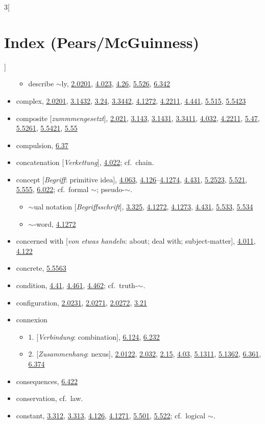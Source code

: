 \documentclass[oneside,openany,12pt]{book}
\newcommand{\indexentry}[1]{\item #1}
\newcommand{\indexsubentry}[1]{\begin{itemize} \item #1 \end{itemize}}
\newcommand{\indexref}[1]{\hyperlink{prop#1}{#1}}
\begin{document}
\begin{multicols}{3}[\section*{Index (Pears/McGuinness)}]
\begin{itemize}
   \indexsubentry{describe $\sim$ly, \indexref{2.0201}, \indexref{4.023}, \indexref{4.26}, \indexref{5.526}, \indexref{6.342}}

\indexentry{complex, \indexref{2.0201}, \indexref{3.1432}, \indexref{3.24}, \indexref{3.3442}, \indexref{4.1272}, \indexref{4.2211}, \indexref{4.441}, \indexref{5.515}, \indexref{5.5423}}

\indexentry{composite [\textit{zummmengesetzt}], \indexref{2.021}, \indexref{3.143}, \indexref{3.1431}, \indexref{3.3411}, \indexref{4.032}, \indexref{4.2211}, \indexref{5.47}, \indexref{5.5261}, \indexref{5.5421}, \indexref{5.55}}

\indexentry{compulsion, \indexref{6.37}}

\indexentry{concatenation [\textit{Verkettung}], \indexref{4.022}; cf.\ chain.}

\indexentry{concept [\textit{Begriff}: primitive idea], \indexref{4.063}, \indexref{4.126}--\indexref{4.1274}, \indexref{4.431}, \indexref{5.2523}, \indexref{5.521}, \indexref{5.555}, \indexref{6.022}; cf.\ formal $\sim$; pseudo-$\sim$.}

   \indexsubentry{$\sim$ual notation [\textit{Begriffsschrift}], \indexref{3.325}, \indexref{4.1272}, \indexref{4.1273}, \indexref{4.431}, \indexref{5.533}, \indexref{5.534}}

   \indexsubentry{$\sim$-word, \indexref{4.1272}}

\indexentry{concerned with [\textit{von etwas handeln}: about; deal with; subject-matter], \indexref{4.011}, \indexref{4.122}}

\indexentry{concrete, \indexref{5.5563}}

\indexentry{condition, \indexref{4.41}, \indexref{4.461}, \indexref{4.462}; cf.\ truth-$\sim$.}

\indexentry{configuration, \indexref{2.0231}, \indexref{2.0271}, \indexref{2.0272}, \indexref{3.21}}

\indexentry{connexion}

   \indexsubentry{1. [\textit{Verbindung}: combination], \indexref{6.124}, \indexref{6.232}}

   \indexsubentry{2. [\textit{Zusammenhang}: nexus], \indexref{2.0122}, \indexref{2.032}, \indexref{2.15}, \indexref{4.03}, \indexref{5.1311}, \indexref{5.1362}, \indexref{6.361}, \indexref{6.374}}

\indexentry{consequences, \indexref{6.422}}

\indexentry{conservation, cf.\ law.}

\indexentry{constant, \indexref{3.312}, \indexref{3.313}, \indexref{4.126}, \indexref{4.1271}, \indexref{5.501}, \indexref{5.522}; cf.\ logical $\sim$.}


\end{itemize}
\end{multicols}
\end{document}
